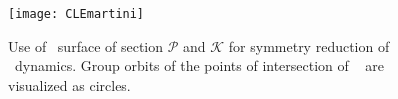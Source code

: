 \begin{figure}[ht]
\begin{center}
  \texttt{[image: CLEmartini]}
\end{center}
\caption{
Use of \Poincare\ surface of section $\mathcal{P}$ and
{\slice} $\mathcal{K}$ for symmetry reduction of \cLe\
dynamics. Group orbits of the points of intersection of \rpo\
 are visualized as circles.
    }
\label{fig:CLEmartini}
\end{figure}

